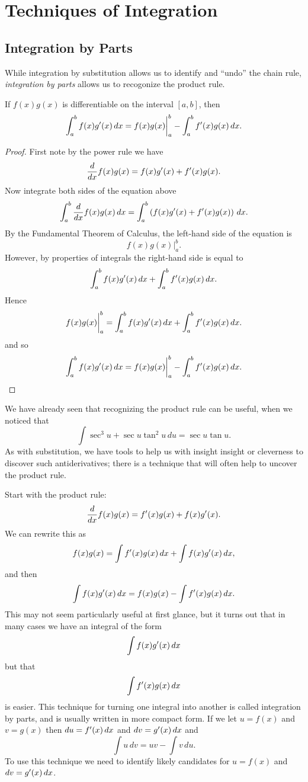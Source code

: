 \chapter{Techniques of Integration}

\section{Integration by Parts}

While integration by substitution allows us to identify and ``undo''
the chain rule, \textit{integration by parts} allows us to recogonize
the product rule.

\begin{mainTheorem} 
If $f(x)g(x)$ is differentiable on the interval $[a,b]$, then
\[
\int_a^b f(x) g'(x) \, d x =f(x)g(x) \bigg|_a^b - \int_a^b f'(x) g(x) \, d x.
\]
\end{mainTheorem}
\begin{proof} First note by the power rule we have
\[
\frac{d}{dx} f(x)g(x) = f(x)g'(x) + f'(x) g(x).
\]
Now integrate both sides of the equation above
\[
\int_a^b \frac{d}{dx} f(x) g(x) \, d x = \int_a^b \left(f(x)g'(x) + f'(x) g(x)\right) \, d x.
\]
By the Fundamental Theorem of Calculus, the left-hand side of the equation is
\[
f(x)g(x) \bigg|_a^b.
\]
However, by properties of integrals the right-hand side is equal to 
\[
\int_a^b f(x)g'(x)\, d x + \int_a^b f'(x) g(x) \, d x.
\]
Hence
\[
f(x)g(x) \bigg|_a^b = \int_a^b f(x)g'(x)\, d x + \int_a^b f'(x) g(x) \, d x.
\]
and so 
\[
 \int_a^b f(x)g'(x)\, d x = f(x)g(x) \bigg|_a^b -  \int_a^b f'(x) g(x) \, d x.
\]
\end{proof}

We have already seen that recognizing the product rule can be useful,
when we noticed that
$$\int \sec^3u+\sec u \tan^2u\,du=\sec u \tan u.$$
As with substitution, we have tools to help us with insight insight or cleverness
to discover such antiderivatives; there is a technique that will often
help to uncover the product rule.

Start with the product rule:
$$\frac{d}{dx} f(x)g(x)=f'(x)g(x)+f(x)g'(x).$$
We can rewrite this as
$$f(x)g(x)=\int f'(x)g(x)\, d x +\int f(x)g'(x)\, d x,$$
and then
$$\int f(x)g'(x)\, d x=f(x)g(x)-\int f'(x)g(x)\, d x.$$
This may not seem particularly useful at first glance, but it turns
out that in many cases we have an integral of the form
$$\int f(x)g'(x)\, d x$$
but that 
$$\int f'(x)g(x)\, d x$$
is easier. This technique for turning one integral into another is
called {\dfont integration by parts\/},
and is usually written in more compact form. If we let $u=f(x)$ and
$v=g(x)$ then $du=f'(x)\, d x$ and $dv=g'(x)\, d x$ and 
$$\int u\,dv = uv-\int v\,du.$$
To use this technique we need to identify likely candidates for
$u=f(x)$ and $dv=g'(x)\, d x$.

